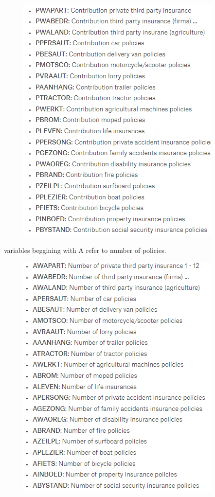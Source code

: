 \documentclass{article}\usepackage[]{graphicx}\usepackage[]{color}
\begin{document}
\begin{figure}[H]
\includegraphics{images/contributionfields.png}
\end{figure}
variables beggining with A refer to number of policies.
\begin{figure}[H]
\includegraphics{images/numberoffields.png}
\end{figure}
\end{document}
